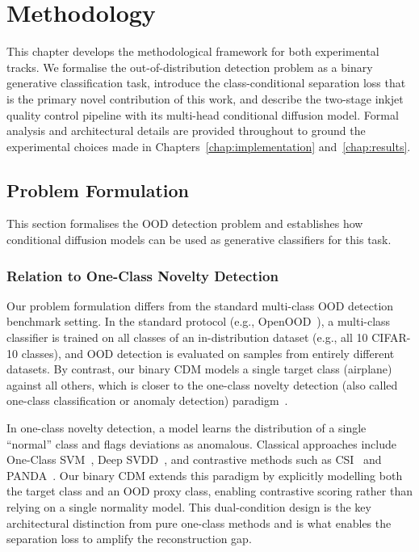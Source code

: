 \cleardoubleoddpage
\begingroup
\fontsize{11pt}{13.2pt}\selectfont
\chapter{Methodology}
\label{chap:methodology}

This chapter develops the methodological framework for both experimental tracks. We formalise the out-of-distribution detection problem as a binary generative classification task, introduce the class-conditional separation loss that is the primary novel contribution of this work, and describe the two-stage inkjet quality control pipeline with its multi-head conditional diffusion model. Formal analysis and architectural details are provided throughout to ground the experimental choices made in Chapters~\ref{chap:implementation} and~\ref{chap:results}.


\section{Problem Formulation}
\label{sec:meth:problem}

This section formalises the OOD detection problem and establishes how conditional diffusion models can be used as generative classifiers for this task.

\subsection{Relation to One-Class Novelty Detection}
\label{sec:meth:problem:oneclass}

Our problem formulation differs from the standard multi-class OOD detection benchmark setting. In the standard protocol (e.g., OpenOOD~\cite{zhang2023openood}), a multi-class classifier is trained on all classes of an in-distribution dataset (e.g., all 10 CIFAR-10 classes), and OOD detection is evaluated on samples from entirely different datasets. By contrast, our binary CDM models a single target class (airplane) against all others, which is closer to the one-class novelty detection (also called one-class classification or anomaly detection) paradigm~\cite{ruff2018deep, tack2020csi}.

In one-class novelty detection, a model learns the distribution of a single ``normal'' class and flags deviations as anomalous. Classical approaches include One-Class SVM~\cite{scholkopf2001estimating}, Deep SVDD~\cite{ruff2018deep}, and contrastive methods such as CSI~\cite{tack2020csi} and PANDA~\cite{reiss2021panda}. Our binary CDM extends this paradigm by explicitly modelling both the target class and an OOD proxy class, enabling contrastive scoring rather than relying on a single normality model. This dual-condition design is the key architectural distinction from pure one-class methods and is what enables the separation loss to amplify the reconstruction gap.

